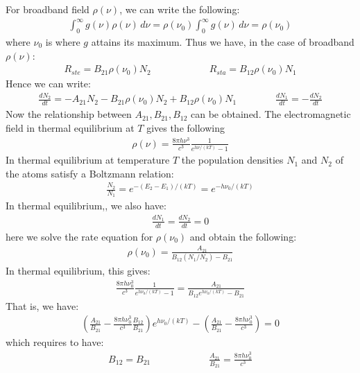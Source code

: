 \documentclass[11pt]{book}
\theoremstyle{break}
\theoremstyle{break}
\begin{document}
For broadband field $\rho(\nu)$, we can write the following:
\begin{align*}
\int_{0}^\infty g(\nu) \rho(\nu) \, d\nu = \rho(\nu_0) \int_0^{\infty}g(\nu) \, d\nu = \rho(\nu_0)
\end{align*}
where $\nu_0$ is where $g$ attains its maximum. Thus we have, in the case of broadband $\rho(\nu)$:
\begin{align*}
R_{ste} = B_{21}\rho(\nu_0) N_2 \qquad\qquad\qquad R_{sta} = B_{12}\rho(\nu_0)N_1  \tag{Broadband $\rho(\nu)$}
\end{align*}
Hence we can write:
\begin{align*}
\frac{dN_2}{dt} = -A_{21}N_2 - B_{21}\rho(\nu_0) N_2 + B_{12}\rho(\nu_0) N_1 \qquad\qquad \frac{dN_1}{dt} = -\frac{dN_2}{dt}
\end{align*}
Now the relationship between $A_{21}, B_{21}, B_{12}$ can be obtained. The electromagnetic field in thermal equilibrium at $T$ gives the following
\begin{align*}
\rho(\nu) = \frac{8\pi h\nu^3}{c^3}\frac{1}{e^{h\nu/(kT)}-1}
\end{align*}
 In thermal equilibrium at temperature $T$ the population densities $N_1$ and $N_2$ of the atoms satisfy a Boltzmann relation:
\begin{align*}
\frac{N_2}{N_1} = e^{-(E_2 - E_1)/(kT)}=e^{-h\nu_0/(kT)}
\end{align*}
In thermal equilibrium,, we also have:
\begin{align*}
\frac{dN_1}{dt} = \frac{dN_2}{dt} = 0
\end{align*}
here we solve the rate equation for $\rho(\nu_0)$ and obtain the following:
\begin{align*}
\rho(\nu_0) = \frac{A_{21}}{B_{12}(N_1/N_2)- B_{21}}
\end{align*}
In thermal equilibrium, this gives:
\begin{align*}
\frac{8\pi h\nu_0^3}{c^3}\frac{1}{e^{h\nu_0/(kT)}-1} = \frac{A_{21}}{B_{12}e^{h\nu_0/(kT)}- B_{21}}
\end{align*}
That is, we have:
\begin{align*}
\left( \frac{A_{21}}{B_{21}}-\frac{8\pi h\nu_0^3}{c^3}\frac{B_{12}}{B_{21}}\right)e^{h\nu_0/(kT)} - \left( \frac{A_{21}}{B_{21}} -\frac{8\pi h\nu_0^3}{c^3}\right) = 0
\end{align*}
which requires to have:
\begin{align*}
B_{12} = B_{21} \qquad\qquad\qquad \frac{A_{21}}{B_{21}} = \frac{8\pi h\nu_0^3}{c^3} \tag{Broadband $\rho(\nu)$}
\end{align*}
\end{document}
